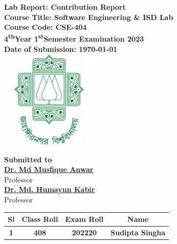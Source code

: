\documentclass[a4paper,12pt]{article}
\begin{document}
\begin{center}
    \textbf{\large{Lab Report: Contribution Report}}\\
    \vspace{0.2cm}
    \textbf{Course Title: Software Engineering \& ISD Lab}\\
    \vspace{0.2cm}
    \textbf{Course Code: CSE-404}\\
    \vspace{0.2cm}
    \textbf{4\textsuperscript{th}Year 1\textsuperscript{st}Semester Examination 2023}\\
    \vspace{0.5cm}
    \textbf{Date of Submission: \today}\\

    \vspace{1.5cm}
    \includegraphics[width=0.35\textwidth]{images/logo.png}\\ %
    \vspace{1cm}

    \textbf{Submitted to}\\
    \vspace{0.2cm}
    \textbf{\href{https://juniv.edu/teachers/musfique.anwar}{Dr. Md Musfique Anwar}}\\
    {Professor}\\
    \vspace{0.2cm}
    \textbf{\href{https://juniv.edu/teachers/hkabir}{Dr. Md. Humayun Kabir}}\\
    {Professor}\\


    \vspace{1cm}

    \begin{table}[h!]
        \centering
        \begin{tabular}{|c|c|c|c|}
            \hline
            \rowcolor[HTML]{2F4F4F} %
            {\color[HTML]{FFFFFF}\textbf{Sl}}& {\color[HTML]{FFFFFF}\textbf{Class Roll}}& {\color[HTML]{FFFFFF}\textbf{Exam Roll}}& {\color[HTML]{FFFFFF}\textbf{Name}}\\ \hline
            \rowcolor[HTML]{B0E0E6}
            \textbf{1}& \textbf{408} & \textbf{202220} & \textbf{Sudipta Singha} \\ \hline


\end{tabular}
\end{table}
\end{center}
\end{document}
